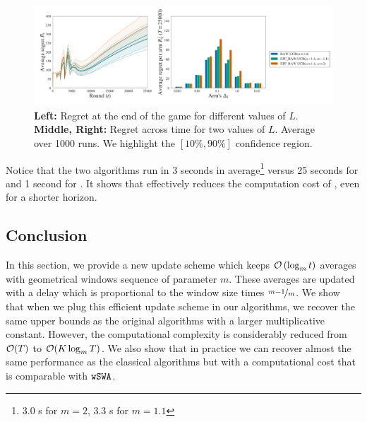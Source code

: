 \begin{figure}[!ht]
\centering
\includegraphics[width = 0.99 \textwidth]{3Rested/fig/fig2_eff.pdf}
\caption{\textbf{Left:} Regret at the end of the game for different values of $L$. \textbf{Middle, Right:} Regret across time for two values of $L$. Average over 1000 runs. We highlight the $\left[10\%, 90\%\right]$ confidence region.}
\label{fig:rested-eff2}
\end{figure}

Notice that the two algorithms run in 3 seconds in average\footnote{3.0 s for $m=2$, 3.3 s for $m=1.1$} versus 25 seconds for \RAWUCB and 1 second for \wSWA. It shows that \EFFRAW effectively reduces the computation cost of \RAWUCB, even for a shorter horizon.



\subsection{Conclusion}
In this section, we provide a new update scheme which keeps $\mathcal{O}\left(\log_m t\right)$ averages with geometrical windows sequence of parameter $m$. These averages are updated with a delay which is proportional to the window size times $\nicefrac{m-1}{m}$. We show that when we plug this efficient update scheme in our algorithms, we recover the same upper bounds as the original algorithms with a larger multiplicative constant. However, the computational complexity is considerably reduced from $\mathcal{O}(T)$ to $\mathcal{O}(K\log_m T)$. We also show that in practice we can recover almost the same performance as the classical algorithms but with a computational cost that is comparable with $\normalfont \texttt{wSWA}$.